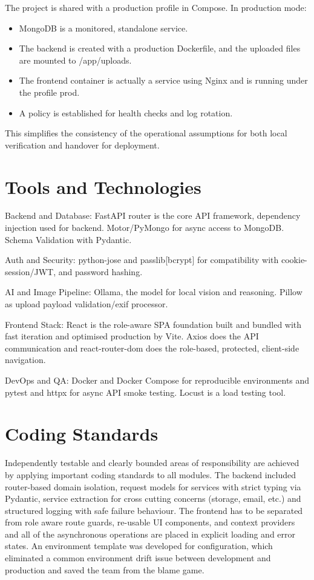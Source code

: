 The project is shared with a production profile in Compose. In production mode:

\begin{itemize}
\item MongoDB is a monitored, standalone service.
\item The backend is created with a production Dockerfile, and the uploaded files are mounted to /app/uploads.
\item The frontend container is actually a service using Nginx and is running under the profile prod.
\item A policy is established for health checks and log rotation.
\end{itemize}

This simplifies the consistency of the operational assumptions for both local verification and handover for deployment.

\section{Tools and Technologies}

Backend and Database: FastAPI router is the core API framework, dependency injection used for backend. Motor/PyMongo for async access to MongoDB. Schema Validation with Pydantic.

Auth and Security: python-jose and passlib[bcrypt] for compatibility with cookie-session/JWT, and password hashing.

AI and Image Pipeline: Ollama, the model for local vision and reasoning. Pillow as upload payload validation/exif processor.

Frontend Stack: React is the role-aware SPA foundation built and bundled with fast iteration and optimised production by Vite. Axios does the API communication and react-router-dom does the role-based, protected, client-side navigation.

DevOps and QA: Docker and Docker Compose for reproducible environments and pytest and httpx for async API smoke testing. Locust is a load testing tool.

\section{Coding Standards}

Independently testable and clearly bounded areas of responsibility are achieved by applying important coding standards to all modules. The backend included router-based domain isolation, request models for services with strict typing via Pydantic, service extraction for cross cutting concerns (storage, email, etc.) and structured logging with safe failure behaviour. The frontend has to be separated from role aware route guards, re-usable UI components, and context providers and all of the asynchronous operations are placed in explicit loading and error states. An environment template was developed for configuration, which eliminated a common environment drift issue between development and production and saved the team from the blame game.


